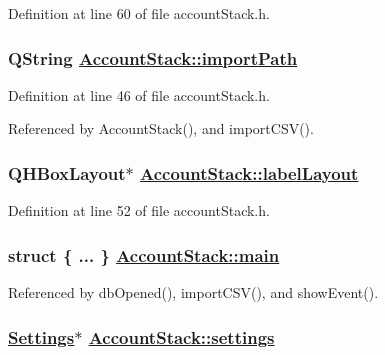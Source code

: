 Definition at line 60 of file account\-Stack.h.\hypertarget{classAccountStack_r3}{
\subsubsection[importPath]{\setlength{\rightskip}{0pt plus 5cm}QString \hyperlink{classAccountStack_r3}{Account\-Stack::import\-Path}}}
\label{classAccountStack_r3}


Definition at line 46 of file account\-Stack.h.

Referenced by Account\-Stack(), and import\-CSV().\hypertarget{classAccountStack_r6}{
\subsubsection[labelLayout]{\setlength{\rightskip}{0pt plus 5cm}QHBox\-Layout$\ast$ \hyperlink{classAccountStack_r6}{Account\-Stack::label\-Layout}}}
\label{classAccountStack_r6}


Definition at line 52 of file account\-Stack.h.\hypertarget{classAccountStack_r16}{
\subsubsection[main]{\setlength{\rightskip}{0pt plus 5cm}struct \{ ... \}   \hyperlink{classAccountStack_r16}{Account\-Stack::main}}}
\label{classAccountStack_r16}




Referenced by db\-Opened(), import\-CSV(), and show\-Event().\hypertarget{classAccountStack_r1}{
\subsubsection[settings]{\setlength{\rightskip}{0pt plus 5cm}\hyperlink{classSettings}{Settings}$\ast$ \hyperlink{classAccountStack_r1}{Account\-Stack::settings}}}
\label{classAccountStack_r1}


